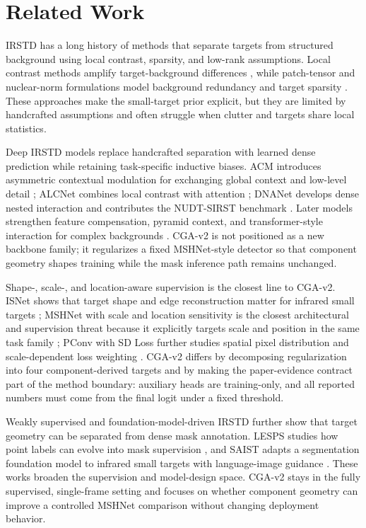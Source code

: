 \documentclass[letterpaper]{article}
\begin{document}
\section{Related Work}

IRSTD has a long history of methods that separate targets from structured background using local contrast, sparsity, and low-rank assumptions. Local contrast methods amplify target-background differences \citep{chen2014local}, while patch-tensor and nuclear-norm formulations model background redundancy and target sparsity \citep{dai2017ript,zhang2019pstnn}. These approaches make the small-target prior explicit, but they are limited by handcrafted assumptions and often struggle when clutter and targets share local statistics.

Deep IRSTD models replace handcrafted separation with learned dense prediction while retaining task-specific inductive biases. ACM introduces asymmetric contextual modulation for exchanging global context and low-level detail \citep{dai2021acm}; ALCNet combines local contrast with attention \citep{dai2021alcnet}; DNANet develops dense nested interaction and contributes the NUDT-SIRST benchmark \citep{li2023dnanet}. Later models strengthen feature compensation, pyramid context, and transformer-style interaction for complex backgrounds \citep{zhang2022fc3net,zhang2023agpcnet,chen2024tciformer}. CGA-v2 is not positioned as a new backbone family; it regularizes a fixed MSHNet-style detector so that component geometry shapes training while the mask inference path remains unchanged.

Shape-, scale-, and location-aware supervision is the closest line to CGA-v2. ISNet shows that target shape and edge reconstruction matter for infrared small targets \citep{zhang2022isnet}; MSHNet with scale and location sensitivity is the closest architectural and supervision threat because it explicitly targets scale and position in the same task family \citep{liu2024sls}; PConv with SD Loss further studies spatial pixel distribution and scale-dependent loss weighting \citep{yang2025pconv}. CGA-v2 differs by decomposing regularization into four component-derived targets and by making the paper-evidence contract part of the method boundary: auxiliary heads are training-only, and all reported numbers must come from the final logit under a fixed threshold.

Weakly supervised and foundation-model-driven IRSTD further show that target geometry can be separated from dense mask annotation. LESPS studies how point labels can evolve into mask supervision \citep{ying2023lesps}, and SAIST adapts a segmentation foundation model to infrared small targets with language-image guidance \citep{zhang2025saist}. These works broaden the supervision and model-design space. CGA-v2 stays in the fully supervised, single-frame setting and focuses on whether component geometry can improve a controlled MSHNet comparison without changing deployment behavior.
\end{document}
